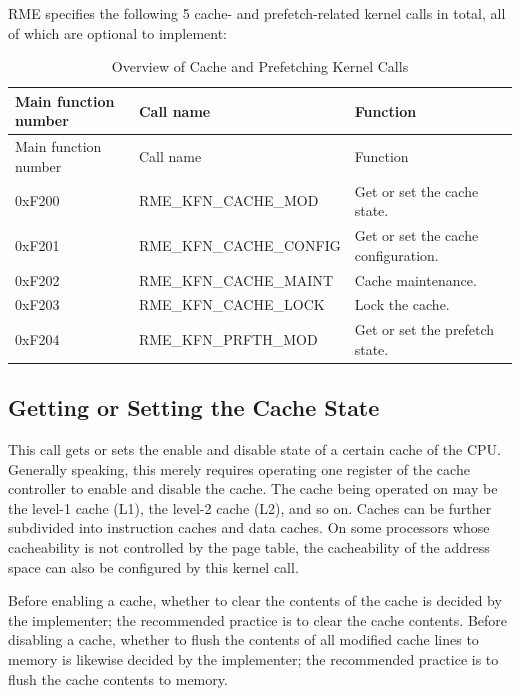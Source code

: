 RME specifies the following 5 cache- and prefetch-related kernel calls in total, all of which are optional to implement:

\begin{xltabular}{\textwidth}{@{}>{\hsize\raggedright\arraybackslash}X>{\hsize\raggedright\arraybackslash}X>{\hsize\raggedright\arraybackslash}X@{}}
\caption{Overview of Cache and Prefetching Kernel Calls}\label{tab:8-24-cache-and-prefetch-kernel-calls}\\
\toprule
Main function number & Call name & Function\tabularnewline
\endfirsthead
\toprule
Main function number & Call name & Function\tabularnewline
\midrule
\endhead
\bottomrule
\endlastfoot
0xF200 & RME\_KFN\_CACHE\_MOD & Get or set the cache state.\tabularnewline
0xF201 & RME\_KFN\_CACHE\_CONFIG & Get or set the cache configuration.\tabularnewline
0xF202 & RME\_KFN\_CACHE\_MAINT & Cache maintenance.\tabularnewline
0xF203 & RME\_KFN\_CACHE\_LOCK & Lock the cache.\tabularnewline
0xF204 & RME\_KFN\_PRFTH\_MOD & Get or set the prefetch state.\tabularnewline
\end{xltabular}
\nopagebreak[4]

\subsection{Getting or Setting the Cache State}\label{subsec:8-get-or-set-cache-state}

This call gets or sets the enable and disable state of a certain cache of the CPU. Generally speaking, this merely requires operating one register of the cache controller to enable and disable the cache. The cache being operated on may be the level-1 cache (L1), the level-2 cache (L2), and so on. Caches can be further subdivided into instruction caches and data caches. On some processors whose cacheability is not controlled by the page table, the cacheability of the address space can also be configured by this kernel call.

Before enabling a cache, whether to clear the contents of the cache is decided by the implementer; the recommended practice is to clear the cache contents. Before disabling a cache, whether to flush the contents of all modified cache lines to memory is likewise decided by the implementer; the recommended practice is to flush the cache contents to memory.

